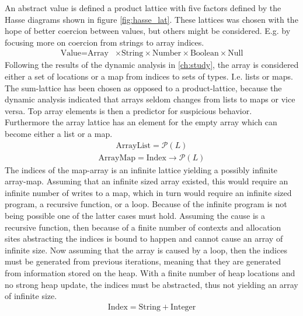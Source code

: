 An abstract value is defined a product lattice with five factors defined by the Hasse diagrams shown in figure \ref{fig:hasse_lat}. These lattices was chosen with the hope of better coercion between values, but others might be considered. E.g. by focusing more on coercion from strings to array indices.
\begin{align}
\text{Value} = \text{Array} & \times \text{String} \times \text{Number} \times \text{Boolean}  \times \text{Null}
\end{align}
Following the results of the dynamic analysis in \ref{ch:study}, the array is considered either a set of locations or a map from indices to sets of types. I.e. lists or maps. The sum-lattice has been chosen as opposed to a product-lattice, because the dynamic analysis indicated that arrays seldom changes from lists to maps or vice versa. Top array elements is then a predictor for suspicious behavior. Furthermore the array lattice has an element for the empty array which can become either a list or a map.  
\begin{align}
\text{ArrayList}= \mathcal{P}( L )
\end{align}
\begin{align}
\text{ArrayMap}=\text{Index} \rightarrow \mathcal{P}( L )
\end{align}
The indices of the map-array is an infinite lattice yielding a possibly infinite array-map. Assuming that an infinite sized array existed, this would require an infinite number of writes to a map, which in turn would require an infinite sized program, a recursive function, or a loop. Because of the infinite program is not being possible one of the latter cases must hold. Assuming the cause is a recursive function, then because of a finite number of contexts and allocation sites abstracting the indices is bound to happen and cannot cause an array of infinite size. Now assuming that the array is caused by a loop, then the indices must be generated from previous iterations, meaning that they are generated from information stored on the heap. With a finite number of heap locations and no strong heap update, the indices must be abstracted, thus not yielding an array of infinite size.
\begin{align}
\text{Index} = \text{String} + \text{Integer}
\end{align}
